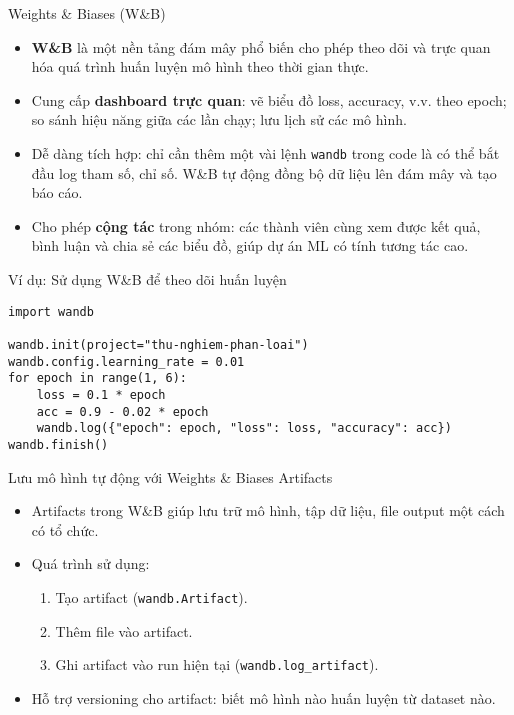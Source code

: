 \documentclass{beamer}
\begin{document}
\begin{frame}{Weights \& Biases (W\&B)}
    \begin{itemize}
        \item \textbf{W\&B} là một nền tảng đám mây phổ biến cho phép theo dõi và trực quan hóa quá trình huấn luyện mô hình theo thời gian thực.
        \item Cung cấp \textbf{dashboard trực quan}: vẽ biểu đồ loss, accuracy, v.v. theo epoch; so sánh hiệu năng giữa các lần chạy; lưu lịch sử các mô hình.
        \item Dễ dàng tích hợp: chỉ cần thêm một vài lệnh \texttt{wandb} trong code là có thể bắt đầu log tham số, chỉ số. W\&B tự động đồng bộ dữ liệu lên đám mây và tạo báo cáo.
        \item Cho phép \textbf{cộng tác} trong nhóm: các thành viên cùng xem được kết quả, bình luận và chia sẻ các biểu đồ, giúp dự án ML có tính tương tác cao.
    \end{itemize}
\end{frame}

\begin{frame}[fragile]{Ví dụ: Sử dụng W\&B để theo dõi huấn luyện}
\begin{verbatim}
import wandb

wandb.init(project="thu-nghiem-phan-loai")
wandb.config.learning_rate = 0.01
for epoch in range(1, 6):
    loss = 0.1 * epoch
    acc = 0.9 - 0.02 * epoch
    wandb.log({"epoch": epoch, "loss": loss, "accuracy": acc})
wandb.finish()
\end{verbatim}
\end{frame}

\begin{frame}{Lưu mô hình tự động với Weights \& Biases Artifacts}
    \begin{itemize}
        \item Artifacts trong W\&B giúp lưu trữ mô hình, tập dữ liệu, file output một cách có tổ chức.
        \item Quá trình sử dụng:
        \begin{enumerate}
            \item Tạo artifact (\texttt{wandb.Artifact}).
            \item Thêm file vào artifact.
            \item Ghi artifact vào run hiện tại (\texttt{wandb.log\_artifact}).
        \end{enumerate}
        \item Hỗ trợ versioning cho artifact: biết mô hình nào huấn luyện từ dataset nào.
    \end{itemize}
\end{frame}
\end{document}
